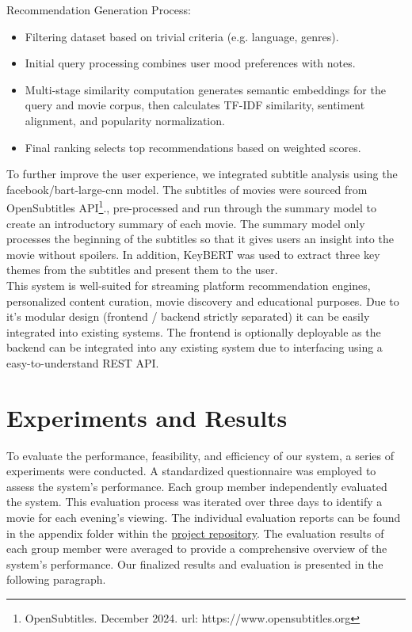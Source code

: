 \documentclass[12pt,a4paper]{article}
\begin{document}
\noindent Recommendation Generation Process:
\begin{itemize}
  \item Filtering dataset based on trivial criteria (e.g. language, genres).
  \item Initial query processing combines user mood preferences with notes.
  \item Multi-stage similarity computation generates semantic embeddings for the query and movie corpus, then calculates TF-IDF similarity, sentiment alignment, and popularity normalization.
  \item Final ranking selects top recommendations based on weighted scores.
\end{itemize}

\noindent To further improve the user experience, we integrated subtitle analysis using the facebook/bart-large-cnn model.
The subtitles of movies were sourced from OpenSubtitles API\footnote{\label{OpenSubtitles}OpenSubtitles. December 2024. url: https://www.opensubtitles.org}., pre-processed and run through the summary model to create an introductory summary of each movie.
The summary model only processes the beginning of the subtitles so that it gives users an insight into the movie without spoilers.
In addition, KeyBERT was used to extract three key themes from the subtitles and present them to the user.
\newline \\
\noindent This system is well-suited for streaming platform recommendation engines, personalized content curation, movie discovery and educational purposes.
Due to it's modular design (frontend / backend strictly separated) it can be easily integrated into existing systems.
The frontend is optionally deployable as the backend can be integrated into any existing system due to interfacing
using a easy-to-understand REST API.

\section{Experiments and Results}

To evaluate the performance, feasibility, and efficiency of our system, a series of experiments were conducted.
A standardized questionnaire was employed to assess the system’s performance.
Each group member independently evaluated the system.
This evaluation process was iterated over three days to identify a movie for each evening’s viewing.
The individual evaluation reports can be found in the appendix folder within the
\href{https://github.com/IImpaq/air-2024/appendix}{project repository}.
The evaluation results of each group member were averaged to provide a comprehensive overview of the system’s performance.
Our finalized results and evaluation is presented in the following paragraph.
\end{document}
